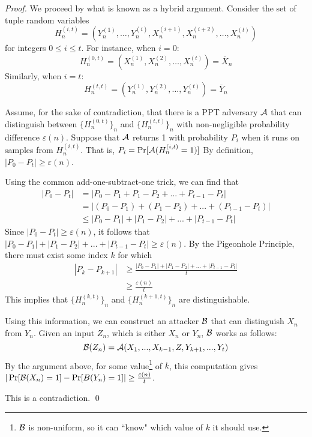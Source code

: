 \begin{proof}
We proceed by what is known as a hybrid argument.
Consider the set of tuple random variables
$$H^{(i,t)}_n = (Y_n^{(1)},\hdots,Y_n^{(i)},X_n^{(i+1)},X_n^{(i+2)},\hdots,X_n^{(t)})$$
for integers $0\le i\le t$. 
For instance, when $i=0$:
$$H^{(0,t)}_n = (X_n^{(1)},X_n^{(2)},\hdots,X_n^{(t)}) = \overline{X}_n$$
Similarly, when $i=t$:
$$H^{(t,t)}_n = (Y_n^{(1)},Y_n^{(2)},\hdots,Y_n^{(t)}) = \overline{Y}_n$$

Assume, for the sake of contradiction, that there is a PPT adversary $\mathcal{A}$ that can distinguish between $\{H^{(0,t)}_n\}_n$ and $\{H^{(t,t)}_n\}_n$ with non-negligible probability difference $\varepsilon(n)$. Suppose that $\mathcal{A}$ returns 1 with probability $P_i$ when it runs on samples from $H^{(i,t)}_n$. 
That is, $P_i = \Pr[\mathcal{A}(H^{(i,t)}_n = 1)]$
By definition, $|P_0 - P_t|\ge \varepsilon(n)$. 

Using the common add-one-subtract-one trick, we can find that
\begin{align*}
|P_0 - P_t| &= |P_0 - P_{1} + P_{1} - P_{2} + ... + P_{t-1} - P_{t}| \\
&= |(P_0 - P_{1}) + (P_{1} - P_{2}) + ... + (P_{t-1} - P_{t})| \\
&\leq  |P_0 - P_{1}| + |P_{1} - P_{2}| + ... + |P_{t-1} - P_{t}|
\end{align*}
Since $|P_0 - P_t| \ge \varepsilon(n)$, it follows that $|P_0 - P_{1}| + |P_{1} - P_{2}| + ... + |P_{t-1} - P_{t}| \ge \varepsilon(n)$.
By the Pigeonhole Principle, there must exist some index $k$ for which
\begin{align*}
|P_k - P_{k+1}| &\ge \frac{|P_0 - P_{1}| + |P_{1} - P_{2}| + ... + |P_{t-1} - P_{t}|}{t} \\
&\geq \frac{\varepsilon(n)}{t}
\end{align*}
This implies that $\{H^{(k,t)}_n\}_n$ and $\{H^{(k+1,t)}_n\}_n$ are distinguishable.

Using this information, we can construct an attacker $\mathcal{B}$ that can distinguish $X_n$ from $Y_n$.
Given an input $Z_n$, which is either $X_n$ or $Y_n$, $\mathcal{B}$ works as follows:
$$\mathcal{B}(Z_n) = \mathcal{A}(X_1, ..., X_{k-1}, Z, Y_{k+1}, ..., Y_t)$$
By the argument above, for some value\footnote{$\mathcal{B}$ is non-uniform, so it can ``know" which value of $k$ it should use.} of $k$, this computation gives $|\Pr[\mathcal{B}(X_n)=1] - \Pr[B(Y_n) = 1]| \ge \frac{\varepsilon(n)}{t}$.


This is a contradiction. 
\qed


\end{proof}
